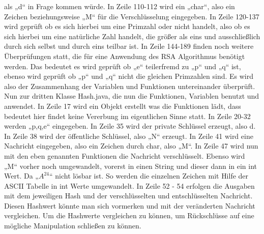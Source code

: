 als „d“ in Frage kommen würde. In Zeile 110-112 wird ein „char“, also ein Zeichen beziehungsweise „M“ für die Verschlüsselung eingegeben. In Zeile 120-137 wird geprüft ob es sich hierbei um eine Primzahl oder nicht handelt, also ob es sich hierbei um eine natürliche Zahl handelt, die größer als eins und ausschließlich durch sich selbst und durch eins teilbar ist. In Zeile 144-189 finden noch weitere Überprüfungen statt, die für eine Anwendung des RSA Algorithmus benötigt werden. Das bedeutet es wird geprüft ob „e“ teilerfremd zu „p“ und „q“ ist, ebenso wird geprüft ob „p“ und „q“ nicht die gleichen Primzahlen sind. Es wird also der Zusammenhang der Variablen und Funktionen untereinander überprüft. Nun zur dritten Klasse Hash.java, die nun die Funktionen, Variablen benutzt und anwendet. In Zeile 17 wird ein Objekt erstellt was die Funktionen lädt, dass bedeutet hier findet keine Vererbung im eigentlichen Sinne statt. In Zeile 20-32 werden „p,q,e“ eingegeben. In Zeile 35 wird der private Schlüssel erzeugt, also d. In Zeile 38 wird der öffentliche Schlüssel, also „N“ erzeugt. In Zeile 41 wird eine Nachricht eingegeben, also ein Zeichen durch char, also „M“. In Zeile 47 wird nun mit den eben genannten Funktionen die Nachricht verschlüsselt. Ebenso wird „M“ vorher noch umgewandelt, vorerst in einen String und dieser dann in ein int Wert. Da „$A^24$“ nicht lösbar ist. So werden die einzelnen Zeichen mit Hilfe der ASCII Tabelle in int Werte umgewandelt. In Zeile 52 - 54 erfolgen die Ausgaben mit dem jeweiligen Hash und der verschlüsselten und entschlüsselten Nachricht. Diesen Hashwert könnte man sich vormerken und mit der veränderten Nachricht vergleichen. Um die Hashwerte vergleichen zu können, um Rückschlüsse auf eine mögliche Manipulation schließen zu können.

